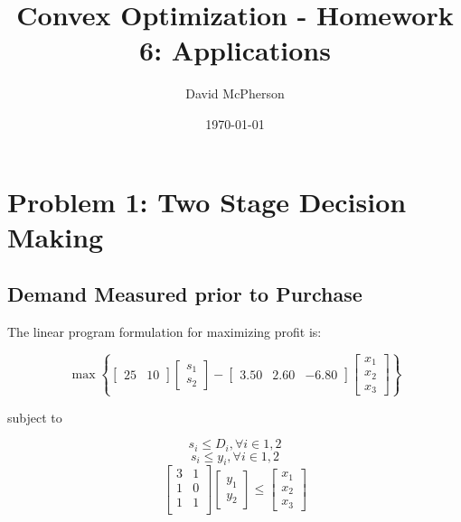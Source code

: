 \documentclass[a4paper]{article}
\title{Convex Optimization - Homework 6: Applications}
\author{David McPherson}
\date{\today}
\begin{document}
\maketitle

\section{Problem 1: Two Stage Decision Making}
\subsection{Demand Measured prior to Purchase}

The linear program formulation for maximizing profit is:

\begin{equation}
\max \left \{ [\begin{matrix}25 & 10\end{matrix}]\left [\begin{matrix}s_1 \\ s_2 \end{matrix} \right ]
-[\begin{matrix}3.50 & 2.60 & -6.80\end{matrix}] \left [\begin{matrix}x_1 \\ x_2 \\ x_3 \end{matrix} \right ]
\right \}
\end{equation}

subject to

\begin{equation}
s_i \leq D_i , \forall i \in {1,2}
\end{equation}
\begin{equation}
s_i \leq y_i , \forall i \in {1,2}
\end{equation}
\begin{equation}
\left[
\begin{matrix}
3 & 1 \\
1 & 0 \\
1 & 1 \\
\end{matrix}
\right]
\left[\begin{matrix}y_1 \\ y_2\end{matrix}\right]
\leq
\left[\begin{matrix}x_1 \\ x_2 \\ x_3 \end{matrix}\right]
\end{equation}
\end{document}
